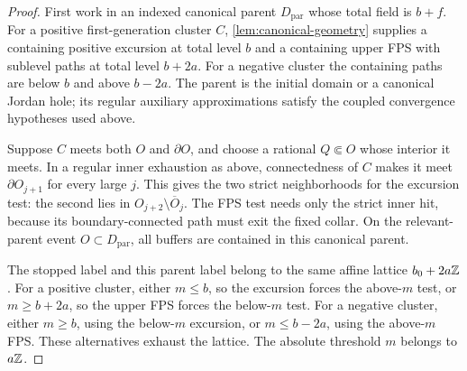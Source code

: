 \begin{proof}
First work in an indexed canonical parent \(D_{\mathrm{par}}\) whose
total field is \(b+f\).
For a positive first-generation cluster \(C\),
\cref{lem:canonical-geometry} supplies a containing positive excursion
at total level \(b\) and a containing upper FPS with sublevel paths at
total level \(b+2a\). For a negative cluster the containing paths are
below \(b\) and above \(b-2a\). The parent is the initial domain or a
canonical Jordan hole; its regular auxiliary approximations satisfy
the coupled convergence hypotheses used above.

Suppose \(C\) meets both \(O\) and \(\partial O\), and choose a rational
\(Q\Subset O\) whose interior it meets. In a regular inner exhaustion
as above, connectedness of \(C\) makes it meet \(\partial O_{j+1}\)
for every large \(j\). This gives the two strict neighborhoods for the
excursion test: the second lies in
\(O_{j+2}\setminus\overline O_j\). The FPS test needs only the strict
inner hit, because its boundary-connected path must exit the fixed
collar. On the relevant-parent event \(O\subset D_{\mathrm{par}}\),
all buffers are contained in this canonical parent.

The stopped label and this parent label belong to the same affine
lattice \(b_0+2a\mathbb Z\). For a positive cluster, either \(m\le b\), so
the excursion forces the above-\(m\) test, or \(m\ge b+2a\), so the
upper FPS forces the below-\(m\) test. For a negative cluster, either
\(m\ge b\), using the below-\(m\) excursion, or \(m\le b-2a\), using
the above-\(m\) FPS. These alternatives exhaust the lattice. The
absolute threshold \(m\) belongs to \(a\mathbb Z\).


\end{proof}
